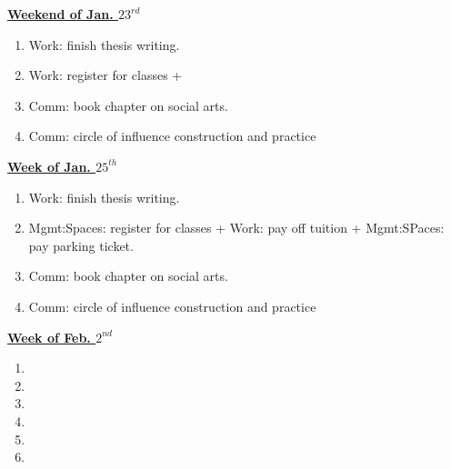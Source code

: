 \documentclass[11pt]{article}
\begin{document}
            {\small \underline{\textbf{Weekend of Jan. $23^{rd}$}} }\\
           \begin{enumerate} 
             \small \item \small Work: finish thesis writing. 
             \item \small Work: register for classes + 
             \item \small Comm: book chapter on social arts. 
             \item \small Comm: circle of influence construction and practice 
           \end{enumerate}

           {\small \underline{\textbf{Week of Jan. $25^{th}$}} }\\
           \begin{enumerate} 
             \small \item \small Work: finish thesis writing. 
           \item \small Mgmt:Spaces: register for classes + Work: pay off tuition  +  Mgmt:SPaces: pay parking ticket.
           \item \small Comm: book chapter on social arts. 
           \item \small Comm: circle of influence construction and practice 
           \end{enumerate}
           
           {\small \underline{\textbf{Week of Feb. $2^{nd}$}} }\\
           \begin{enumerate}
             \small \item \small 
           \item \small
           \item \small 
           \item \small 
           \item \small 
           \item \small          
           \end{enumerate}
           \newpage
         
\end{document}
